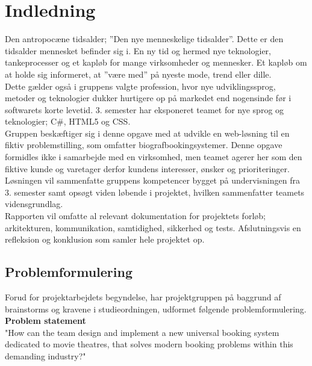 \chapter{Indledning}\label{ch:indledning}
Den antropocæne tidsalder; ”Den nye menneskelige tidsalder”. Dette er den tidsalder mennesket befinder sig i.
En ny tid og hermed nye teknologier, tankeprocesser og et kapløb for mange virksomheder og mennesker. 
Et kapløb om at holde sig informeret, at ”være med” på nyeste mode, trend eller dille. \\

Dette gælder også i gruppens valgte profession, hvor nye udviklingssprog, metoder og teknologier dukker 
hurtigere op på markedet end nogensinde før i softwarets korte levetid. 3. semester har eksponeret teamet for nye sprog og teknologier; 
C\#, HTML5 og CSS. \\

Gruppen beskæftiger sig i denne opgave med at udvikle en web-løsning til en fiktiv problemstilling,
som omfatter biografbookingsystemer. Denne opgave formidles ikke i samarbejde med en virksomhed, 
men teamet agerer her som den fiktive kunde og varetager derfor kundens interesser, ønsker og prioriteringer. \\

Løsningen vil sammenfatte gruppens kompetencer bygget på undervisningen fra 3. semester samt opsøgt viden løbende i 
projektet, hvilken sammenfatter teamets vidensgrundlag. \\

Rapporten vil omfatte al relevant dokumentation for projektets forløb; arkitekturen, 
kommunikation, samtidighed, sikkerhed og tests. Afslutningsvis en refleksion og konklusion som samler hele projektet op.

\newpage
\section{Problemformulering}\label{sec:problemformulering}
Forud for projektarbejdets begyndelse, har projektgruppen på baggrund af brainstorms og kravene i
studieordningen, udformet følgende problemformulering. \\

\textbf{Problem statement} \\
"How can the team design and implement a new universal booking system dedicated to movie theatres, 
that solves modern booking problems within this demanding industry?" \\

